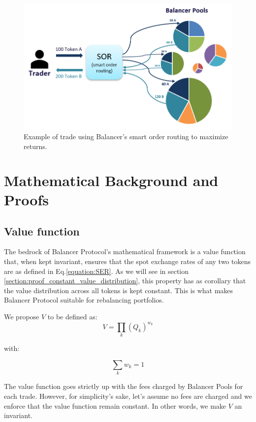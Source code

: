 \documentclass[11pt]{amsart}
\begin{document}
\begin{figure}
  \includegraphics[]{smart_order_routing}
  \caption{Example of trade using Balancer's smart order routing to maximize returns.}
  \label{fig:smart_order_routing}
\end{figure}

\section{Mathematical Background and Proofs}
\label{section:maths}

\subsection{Value function}
The bedrock of Balancer Protocol's mathematical framework is a value function that, when kept invariant, ensures that the spot exchange rates of any two tokens are as defined in Eq.\ref{equation:SER}. As we will see in section \ref{section:proof_constant_value_distribution}, this property has as corollary that the value distribution across all tokens is kept constant. This is what makes Balancer Protocol suitable for rebalancing portfolios.

We propose $V$ to be defined as:
\begin{equation}
\label{equation:value_function}
V = \prod_{k}(Q_k)^{w_k} 
\end{equation}

with:

\begin{equation}
\label{equation:sum_weights}
\sum_{k} w_k = 1
\end{equation}

The value function goes strictly up with the fees charged by Balancer Pools for each trade. However, for simplicity's sake, let's assume no fees are charged and we enforce that the value function remain constant. In other words, we make $V$ an invariant.
\end{document}

